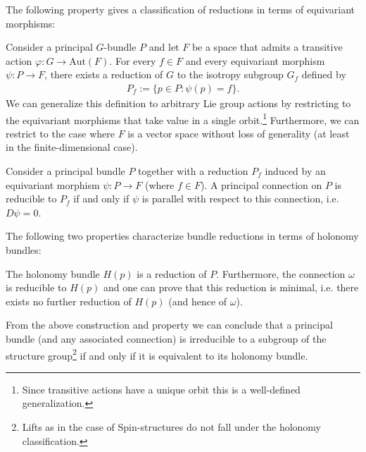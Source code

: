    The following property gives a classification of reductions in terms of equivariant morphisms:
    \begin{property}\label{diff:prin:reduction_classification}
        Consider a principal $G$-bundle $P$ and let $F$ be a space that admits a transitive action $\varphi:G\rightarrow\text{Aut}(F)$. For every $f\in F$ and every equivariant morphism $\psi:P\rightarrow F$, there exists a reduction of $G$ to the isotropy subgroup $G_f$ defined by
        \begin{gather}
            P_f := \{p\in P:\psi(p) = f\}.
        \end{gather}
        We can generalize this definition to arbitrary Lie group actions by restricting to the equivariant morphisms that take value in a single orbit.\footnote{Since transitive actions have a unique orbit this is a well-defined generalization.} Furthermore, we can restrict to the case where $F$ is a vector space without loss of generality (at least in the finite-dimensional case).
    \end{property}

    \begin{property}\label{diff:prin:connection_reducibility}
        Consider a principal bundle $P$ together with a reduction $P_f$ induced by an equivariant morphism $\psi:P\rightarrow F$ (where $f\in F$). A principal connection on $P$ is reducible to $P_f$ if and only if $\psi$ is parallel with respect to this connection, i.e. $D\psi = 0$.
    \end{property}

    The following two properties characterize bundle reductions in terms of holonomy bundles:
    \begin{property}
        The holonomy bundle $H(p)$ is a reduction of $P$. Furthermore, the connection $\omega$ is reducible to $H(p)$ and one can prove that this reduction is minimal, i.e. there exists no further reduction of $H(p)$ (and hence of $\omega$).
    \end{property}
    \begin{result}\label{diff:prin:reducible_holonomy}
        From the above construction and property we can conclude that a principal bundle (and any associated connection) is irreducible to a subgroup of the structure group\footnote{Lifts as in the case of Spin-structures do not fall under the holonomy classification.} if and only if it is equivalent to its holonomy bundle.
    \end{result}